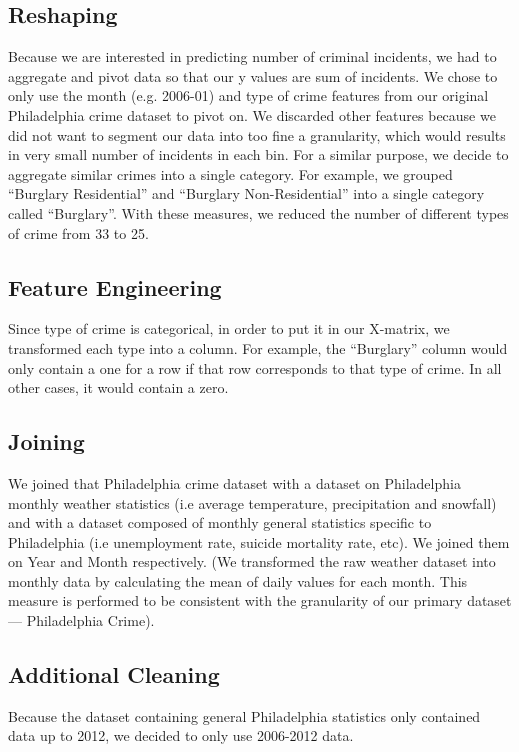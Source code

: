 \documentclass{article}
\begin{document}
\subsection*{Reshaping}
Because we are interested in predicting number of criminal incidents, we had to aggregate and pivot data so that our y values are sum of incidents. We chose to only use the month (e.g. 2006-01) and type of crime features from our original Philadelphia crime dataset to pivot on. We discarded other features because we did not want to segment our data into too fine a granularity, which would results in very small number of incidents in each bin.  For a similar purpose, we decide to aggregate similar crimes into a single category. For example, we grouped “Burglary Residential” and “Burglary Non-Residential” into a single category called “Burglary”. With these measures, we reduced the number of different types of crime from 33 to 25. 

\subsection*{Feature Engineering}
Since type of crime is categorical, in order to put it in our X-matrix, we transformed each type into a column. For example, the “Burglary” column would only contain a one for a row if that row corresponds to that type of crime. In all other cases, it would contain a zero.

\subsection*{Joining}
We joined that Philadelphia crime dataset with a dataset on Philadelphia monthly weather statistics (i.e average temperature, precipitation and snowfall) and with a dataset composed of monthly general statistics specific to Philadelphia (i.e unemployment rate,  suicide mortality rate, etc). We joined them on Year and Month respectively. (We transformed the raw weather dataset into monthly data by calculating the mean of daily values for each month. This measure is performed to be consistent with the granularity of our primary dataset — Philadelphia Crime).

\subsection*{Additional Cleaning}
Because the dataset containing general Philadelphia statistics only contained data up to 2012, we decided to only use 2006-2012 data.
\end{document}
